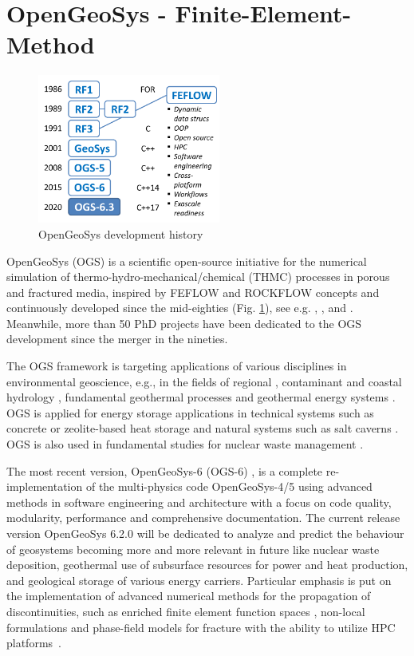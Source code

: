 \section{OpenGeoSys - Finite-Element-Method}
\label{app:ogs}

\begin{figure}
  \centering
  \includegraphics[width=6cm]{figures/ogs-2020}
  \caption{OpenGeoSys development history}
  \label{fig:ogs-history}
\end{figure}
OpenGeoSys (OGS) is a scientific open-source initiative for the numerical simulation of thermo-hydro-mechanical/chemical (THMC) processes in porous and fractured media, inspired by FEFLOW \cite{Diersch2014} and ROCKFLOW concepts and continuously developed since the mid-eighties (Fig. \ref{fig:ogs-history}), see e.g. \cite{Kolditz:1990}, \cite{Wollrath:1990}, \cite{Kroehn:1991} and \cite{Helmig:1993}. Meanwhile, more than 50 PhD projects have been dedicated to the OGS development since the merger in the nineties.

The OGS framework is targeting applications of various disciplines in environmental geoscience, e.g., in the fields of regional \cite{Jing20181989}, contaminant \cite{Nixdorf2017598} and coastal hydrology \cite{Walther2017648}, fundamental geothermal processes \cite{Parisio2019} and geothermal energy systems \cite{Meng2018971,HEIN201680}.
%
OGS is applied for energy storage applications in technical systems such as concrete \cite{Miao2019977} or  zeolite-based heat storage \cite{Lehmann20191102} and natural systems such as salt caverns \cite{Bottcher2017,Nagel2017}. 
%
OGS is also used in fundamental studies for nuclear waste management \cite{Shao201933}.

The most recent version, OpenGeoSys-6 (OGS-6) \cite{Naumov:2018,Bilke2019}, is a complete re-implementation of the multi-physics code OpenGeoSys-4/5 \cite{Kolditz2004225,Wang:2006} using advanced methods in software engineering and architecture with a focus on code quality, modularity, performance and comprehensive documentation. The current release version OpenGeoSys 6.2.0 \cite{ogs:6.2.0} will be dedicated to analyze and predict the behaviour of geosystems becoming more and more relevant in future like nuclear waste deposition, geothermal use of subsurface resources for power and heat production, and geological storage of various energy carriers. Particular emphasis is put on the implementation of advanced numerical methods for the propagation of discontinuities, such as enriched finite element function spaces \cite{Watanabe2012}, non-local formulations \cite{Parisio2017} and phase-field models for fracture \cite{Yoshioka2019} with the ability to utilize HPC platforms~\cite{Wang2014a,Wang:2017}.

